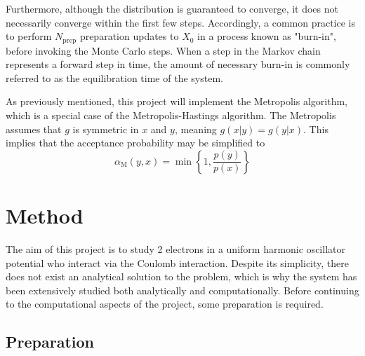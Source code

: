 \documentclass[nofootinbib,reprint,english]{revtex4-1}
\begin{document}
Furthermore, although the distribution is guaranteed to converge, it does not necessarily converge within the first few steps. Accordingly, a common practice is to perform \(N_\text{prep}\) preparation updates to \(X_0\) in a process known as "burn-in", before invoking the Monte Carlo steps. When a step in the Markov chain represents a forward step in time, the amount of necessary burn-in is commonly referred to as the equilibration time of the system.

As previously mentioned, this project will implement the Metropolis algorithm, which is a special case of the Metropolis-Hastings algorithm. The Metropolis assumes that \(g\) is symmetric in \(x\) and \(y\), meaning \(g(x|y)=g(y|x)\). This implies that the acceptance probability may be simplified to
\begin{equation}\label{eq:Metropolis_acceptance_probability}
\alpha_\text{M}(y,x)=\min\left\lbrace1,\frac{p(y)}{p(x)}\right\rbrace
\end{equation}

\section{Method}
The aim of this project is to study 2 electrons in a uniform harmonic oscillator potential who interact via the Coulomb interaction. Despite its simplicity, there does not exist an analytical solution to the problem, which is why the system has been extensively studied both analytically and computationally. Before continuing to the computational aspects of the project, some preparation is required.
\subsection{Preparation}
\end{document}
